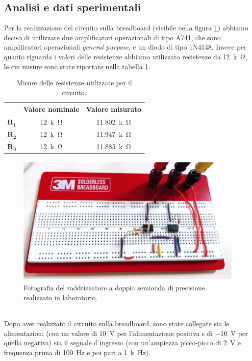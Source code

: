 \documentclass{report}
\begin{document}
\subsection{Analisi e dati sperimentali}
Per la realizzazione del circuito sulla breadboard (visibile nella figura \ref{figura:circuito1}) abbiamo deciso di utilizzare due amplificatori operazionali di tipo \textmu A741, che sono amplificatori operazionali \textit{general purpose}, e un diodo di tipo 1N4148.
Invece per quanto riguarda i valori delle resistenze abbiamo utilizzato resistenze da \SI{12}{k\ohm}, le cui misure sono state riportate nella tabella \ref{table:mis_res1}.
\begin{table}[h!]
	\centering
	\begin{tabular}{|c|c|c|}
		\cline{2-3} 
		\multicolumn{1}{c|}{} & \textbf{Valore nominale} & \textbf{Valore misurato}\\ 
		\hline
		$\mathbf{R_1}$ & \SI{12}{k\ohm} & \SI{11.802}{k\ohm} \\ 
		\hline
		$\mathbf{R_2}$ & \SI{12}{k\ohm} & \SI{11.947}{k\ohm} \\ 
		\hline
		$\mathbf{R_3}$ & \SI{12}{k\ohm} & \SI{11.885}{k\ohm} \\ 
		\hline
	\end{tabular}
	\caption{Misure delle resistenze utilizzate per il circuito.}
	\label{table:mis_res1}
\end{table}
\begin{figure}[h]
	\centering
	\includegraphics[height=6.5cm]{immagini/circuito1}
	\caption{Fotografia del raddrizzatore a doppia semionda di precisione realizzato in laboratorio.}
	\label{figura:circuito1}
\end{figure}
\\\indent Dopo aver realizzato il circuito sulla breadboard, sono state collegate sia le alimentazioni (con un valore di \SI{+10}{\volt} per l'alimentazione positiva e di \SI{-10}{\volt} per quella negativa) sia il segnale d'ingresso (con un'ampiezza picco-picco di \SI{2}{\volt} e frequenza prima di \SI{100}{\hertz} e poi pari a \SI{1}{k\hertz}).\par
\end{document}
